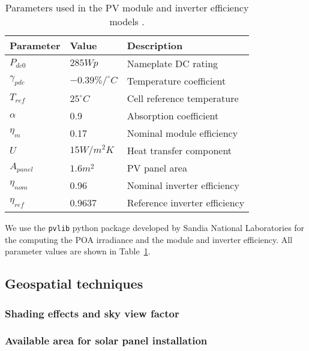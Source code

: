 \begin{table}[htbp]
\centering
\footnotesize
    \begin{tabular}{lll}
    \hline
    \textbf{Parameter} & \textbf{Value}     & \textbf{Description}          \\ \hline
    $P_{dc0}$          & $285 Wp$           & Nameplate DC rating           \\
    $\gamma_{pdc}$     & $-0.39\%/ ^\circ C$& Temperature coefficient       \\
    $T_{ref}$          & $25^\circ C$       & Cell reference temperature    \\
    $\alpha$           & 0.9                & Absorption coefficient        \\
    $\eta_m$           & 0.17               & Nominal module efficiency     \\
    $U$                & $15 W/m^2K$        & Heat transfer component       \\
    $A_{panel}$        & $1.6 m^2$          & PV panel area                 \\
    $\eta_{nom}$       & 0.96               & Nominal inverter efficiency   \\
    $\eta_{ref}$       & 0.9637             & Reference inverter efficiency \\ \hline
    \end{tabular}
\caption{Parameters used in the PV module and inverter efficiency models \cite{dobos_pvwatts_2014, faiman_assessing_2008}.}
\label{tab:efficiency}
\end{table}

We use the \texttt{pvlib} python package developed by Sandia National Laboratories \cite{holmgren_pvlib_2018} for the computing the POA irradiance and the module and inverter efficiency. All parameter values are shown in Table~\ref{tab:efficiency}.

\subsection{Geospatial techniques}
\label{GIS_methods}

\subsubsection{Shading effects and sky view factor}

\subsubsection{Available area for solar panel installation}


